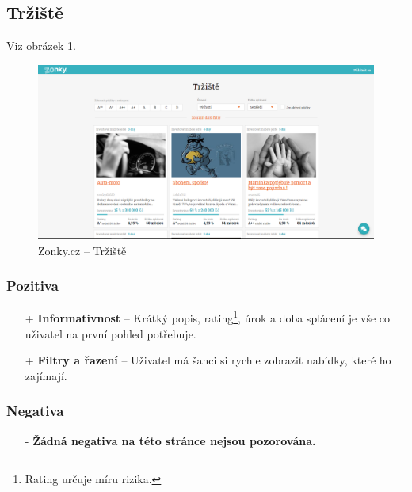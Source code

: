 \newpage
\subsection{Tržiště}
Viz obrázek \ref{fig:zonky:marketplace}.
\begin{figure}[h]
    \centering
    \includegraphics[width=1.0\textwidth]{media/zonky/marketplace.png}
    \caption{Zonky.cz -- Tržiště}
    \label{fig:zonky:marketplace}
\end{figure}
\subsubsection*{Pozitiva}
\begin{itemize}
    \item[+] \textbf{Informativnost} -- Krátký popis, rating\footnote{Rating určuje míru rizika.}, úrok a doba splácení je vše co uživatel na první pohled potřebuje.
    \item[+] \textbf{Filtry a řazení} -- Uživatel má šanci si rychle zobrazit nabídky, které ho zajímají.
\end{itemize}
\subsubsection*{Negativa}
\begin{itemize}
    \item[-] \textbf{Žádná negativa na této stránce nejsou pozorována.}
\end{itemize}



\newpage
